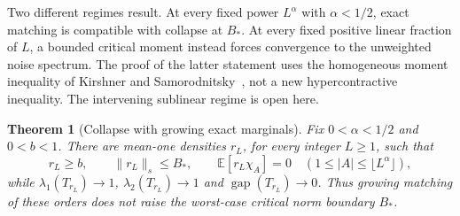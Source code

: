 \documentclass[11pt]{article}
\newtheorem{theorem}{Theorem}
\newcommand{\gap}{\operatorname{gap}}
\begin{document}
Two different regimes result. At every fixed power $L^\alpha$ with
$\alpha<1/2$, exact matching is compatible with collapse at $B_*$.
At every fixed positive linear fraction of $L$, a bounded critical moment
instead forces convergence to the unweighted noise spectrum. The proof of
the latter statement uses the homogeneous moment inequality of
Kirshner and Samorodnitsky~\cite{kirshner-samorodnitsky}, not a new
hypercontractive inequality. The intervening sublinear regime is open here.

\begin{theorem}[Collapse with growing exact marginals]
\label{thm:growing-collapse}
Fix $0<\alpha<1/2$ and $0<b<1$. There are mean-one densities $r_L$,
for every integer $L\geq1$, such that
\[
 r_L\geq b,\qquad \|r_L\|_s\leq B_*,\qquad
 \mathbb E[r_L\chi_A]=0\quad(1\leq |A|\leq\lfloor L^\alpha\rfloor),
\]
while $\lambda_1(T_{r_L})\to1$, $\lambda_2(T_{r_L})\to1$ and
$\gap(T_{r_L})\to0$. Thus growing matching of these orders does not
raise the worst-case critical norm boundary $B_*$.
\end{theorem}
\end{document}
